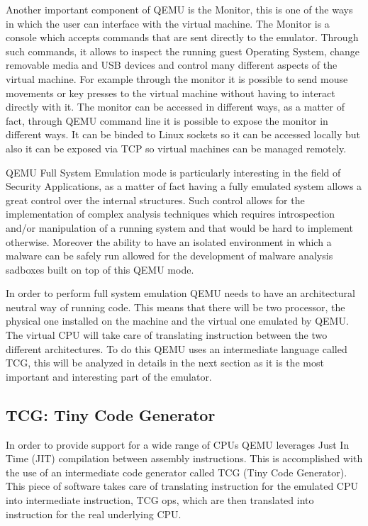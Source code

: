 Another important component of QEMU is the Monitor, this is one of the ways in which the user can interface with the virtual machine. The Monitor is a console which accepts commands that are sent directly to the emulator. Through such commands, it allows to inspect the running guest Operating System, change removable media and USB devices and control many different aspects of the virtual machine. For example through the monitor it is possible to send mouse movements or key presses to the virtual machine without having to interact directly with it. The monitor can be accessed in different ways, as a matter of fact, through QEMU command line it is possible to expose the monitor in different ways. It can be binded to Linux sockets so it can be accessed locally but also it can be exposed via TCP so virtual machines can be managed remotely.

QEMU Full System Emulation mode is particularly interesting in the field of Security Applications, as a matter of fact having a fully emulated system allows a great control over the internal structures. Such control allows for the implementation of complex analysis techniques which requires introspection and/or manipulation of a running system and that would be hard to implement otherwise. Moreover the ability to have an isolated environment in which a malware can be safely run allowed for the development of malware analysis sadboxes built on top of this QEMU mode. 

In order to perform full system emulation QEMU needs to have an architectural neutral way of running code. This means that there will be two processor, the physical one installed on the machine and the virtual one emulated by QEMU. The virtual CPU will take care of translating instruction between the two different architectures. To do this QEMU uses an intermediate language called TCG, this will be analyzed in details in the next section as it is the most important and interesting part of the emulator.


\subsection{TCG: Tiny Code Generator}

In order to provide support for a wide range of CPUs QEMU leverages Just In Time (JIT) compilation between assembly instructions. This is accomplished with the use of an intermediate code generator called TCG (Tiny Code Generator). This piece of software takes care of translating instruction for the emulated CPU into intermediate instruction, TCG ops, which are then translated into instruction for the real underlying CPU.

